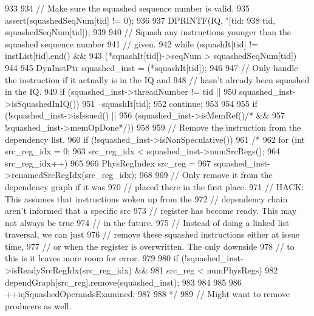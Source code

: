 \begin{DoxyCode}
933 {
934     // Make sure the squashed sequence number is valid.
935     assert(squashedSeqNum[tid] != 0);
936 
937     DPRINTF(IQ, "[tid:%
938             tid, squashedSeqNum[tid]);
939 
940     // Squash any instructions younger than the squashed sequence number
941     // given.
942     while (squashIt[tid] != instList[tid].end() &&
943            (*squashIt[tid])->seqNum > squashedSeqNum[tid]) {
944 
945         DynInstPtr squashed_inst = (*squashIt[tid]);
946 
947         // Only handle the instruction if it actually is in the IQ and
948         // hasn't already been squashed in the IQ.
949         if (squashed_inst->threadNumber != tid ||
950             squashed_inst->isSquashedInIQ()) {
951             --squashIt[tid];
952             continue;
953         }
954 
955         if (!squashed_inst->isIssued() ||
956             (squashed_inst->isMemRef()/* &&
957                                          !squashed_inst->memOpDone*/)) {
958 
959             // Remove the instruction from the dependency list.
960             if (!squashed_inst->isNonSpeculative()) {
961 /*
962                 for (int src_reg_idx = 0;
963                      src_reg_idx < squashed_inst->numSrcRegs();
964                      src_reg_idx++)
965                 {
966                     PhysRegIndex src_reg =
967                         squashed_inst->renamedSrcRegIdx(src_reg_idx);
968 
969                     // Only remove it from the dependency graph if it was
970                     // placed there in the first place.
971                     // HACK: This assumes that instructions woken up from the
972                     // dependency chain aren't informed that a specific src
973                     // register has become ready.  This may not always be true
974                     // in the future.
975                     // Instead of doing a linked list traversal, we can just
976                     // remove these squashed instructions either at issue time,
977                     // or when the register is overwritten.  The only downside
978                     // to this is it leaves more room for error.
979 
980                     if (!squashed_inst->isReadySrcRegIdx(src_reg_idx) &&
981                         src_reg < numPhysRegs) {
982                         dependGraph[src_reg].remove(squashed_inst);
983                     }
984 
985 
986                     ++iqSquashedOperandsExamined;
987                 }
988 */
989                 // Might want to remove producers as well.
}}}}
\end{DoxyCode}
